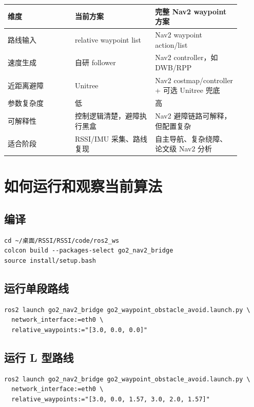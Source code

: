 \documentclass[UTF8,a4paper,12pt]{ctexrep}
\newcommand{\code}[1]{\texttt{\detokenize{#1}}}
\begin{document}
\begin{longtable}{p{0.26\linewidth}p{0.31\linewidth}p{0.33\linewidth}}
\toprule
维度 & 当前方案 & 完整 Nav2 waypoint 方案 \\
\midrule
路线输入 & relative waypoint list & Nav2 waypoint action/list \\
速度生成 & 自研 follower & Nav2 controller，如 DWB/RPP \\
近距离避障 & Unitree \code{obstacles_avoid} & Nav2 costmap/controller + 可选 Unitree 兜底 \\
参数复杂度 & 低 & 高 \\
可解释性 & 控制逻辑清楚，避障执行黑盒 & Nav2 避障链路可解释，但配置复杂 \\
适合阶段 & RSSI/IMU 采集、路线复现 & 自主导航、复杂绕障、论文级 Nav2 分析 \\
\bottomrule
\end{longtable}

\chapter{如何运行和观察当前算法}

\section{编译}

\begin{lstlisting}
cd ~/桌面/RSSI/RSSI/code/ros2_ws
colcon build --packages-select go2_nav2_bridge
source install/setup.bash
\end{lstlisting}

\section{运行单段路线}

\begin{lstlisting}
ros2 launch go2_nav2_bridge go2_waypoint_obstacle_avoid.launch.py \
  network_interface:=eth0 \
  relative_waypoints:="[3.0, 0.0, 0.0]"
\end{lstlisting}

\section{运行 L 型路线}

\begin{lstlisting}
ros2 launch go2_nav2_bridge go2_waypoint_obstacle_avoid.launch.py \
  network_interface:=eth0 \
  relative_waypoints:="[3.0, 0.0, 1.57, 3.0, 2.0, 1.57]"
\end{lstlisting}
\end{document}
